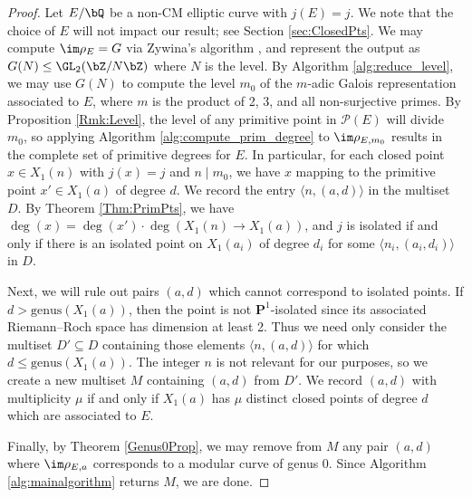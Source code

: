 \documentclass[11pt,reqno]{amsart}
\theoremstyle{plain}
\theoremstyle{definition}
\newcommand{\Q}{\bQ}
\newcommand{\Z}{\bZ}
\begin{document}
\begin{proof}
Let $E/\Q$ be a non-CM elliptic curve with $j(E)=j$. We note that the choice of $E$ will not impact our result; see Section \ref{sec:ClosedPts}. We may compute $\im \rho_E=G$ via Zywina's algorithm \cite{ZywinaAlgorithm}, and represent the output as $G(N) \leq \GL_2(\Z/N\Z)$ where $N$ is the level. By Algorithm \ref{alg:reduce_level}, we may use $G(N)$ to compute the level $m_0$ of the $m$-adic Galois representation associated to $E$, where $m$ is the product of 2, 3, and all non-surjective primes. By Proposition \ref{Rmk:Level}, the level of any primitive point in $\mathcal{P}(E)$ will divide $m_0$, so applying Algorithm \ref{alg:compute_prim_degree} to $\im \rho_{E,m_0}$ results in the complete set of primitive degrees for $E$. In particular, for each closed point $x \in X_1(n)$ with $j(x)=j$ and $n \mid m_0$, we have $x$ mapping to the primitive point $x' \in X_1(a)$ of degree $d$. We record the entry $\langle n, ( a, d) \rangle$ in the multiset $D$. By Theorem \ref{Thm:PrimPts}, we have $\deg(x)=\deg(x') \cdot \deg(X_1(n) \rightarrow X_1(a))$, and $j$ is isolated if and only if there is an isolated point on $X_1(a_i)$ of degree $d_i$ for some $\langle n_i, ( a_i, d_i) \rangle$ in $D$.


Next, we will rule out pairs $(a,d)$ which cannot correspond to isolated points. If $d> \text{genus}(X_1(a))$, then the point is not $\mathbf{P}^1$-isolated since its associated Riemann--Roch space has dimension at least 2. Thus we need only consider the multiset $D' \subseteq D$ containing those elements $\langle n,( a, d) \rangle$ for which $d \leq \text{genus}(X_1(a))$. The integer $n$ is not relevant for our purposes, so we create a new multiset $M$ containing $(a,d)$ from $D'$. We record $(a,d)$ with multiplicity $\mu$ if and only if $X_1(a)$ has $\mu$ distinct closed points of degree $d$ which are associated to $E$.

Finally, by Theorem \ref{Genus0Prop}, we may remove from $M$ any pair $(a,d)$ where $\im \rho_{E,a}$ corresponds to a modular curve of genus 0. Since Algorithm \ref{alg:mainalgorithm} returns $M$, we are done.
\end{proof}
\end{document}
